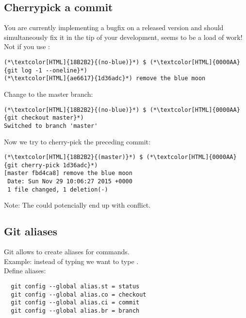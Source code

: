 \subsection{Cherrypick a commit}
\begin{frame}[fragile]
    \subslidetitle
  You are currently implementing a bugfix on a released version and should simultaneously fix it in the tip of your development, seems to be a load of work! Not if you use :
  \begin{lstlisting}
(*\textcolor[HTML]{18B2B2}{(no-blue)}*) $ (*\textcolor[HTML]{0000AA}{git log -1 --oneline}*)
(*\textcolor[HTML]{ae6617}{1d36adc}*) remove the blue moon
\end{lstlisting}
  Change to the master branch:
  \begin{lstlisting}
(*\textcolor[HTML]{18B2B2}{(no-blue)}*) $ (*\textcolor[HTML]{0000AA}{git checkout master}*)
Switched to branch 'master'
\end{lstlisting}
  Now we try to cherry-pick the preceding commit:
  \begin{lstlisting}
(*\textcolor[HTML]{18B2B2}{(master)}*) $ (*\textcolor[HTML]{0000AA}{git cherry-pick 1d36adc}*)
[master fbd4ca8] remove the blue moon
 Date: Sun Nov 29 10:06:27 2015 +0000
 1 file changed, 1 deletion(-)
\end{lstlisting}
  Note:  The  could potencially end up with conflict.
\end{frame}

\subsection{Git aliases}
\begin{frame}[fragile]
  \subslidetitle

  Git allows to create aliases for commands.
  \\
  \vspace{1em}
  Example:
  instead of typing  we want to type .
  \\
  \vspace{1em}
  Define aliases:

  \begin{lstlisting}
  git config --global alias.st = status
  git config --global alias.co = checkout
  git config --global alias.ci = commit
  git config --global alias.br = branch
  \end{lstlisting}

\end{frame}

